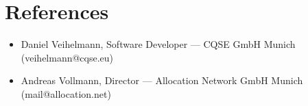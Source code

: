 \documentclass[11pt,a4paper]{article}
\begin{document}
\vspace{-10pt}

\section*{References}
\begin{itemize}
	\item Daniel Veihelmann, Software Developer — CQSE GmbH Munich (veihelmann@cqse.eu)
	\item Andreas Vollmann, Director — Allocation Network GmbH Munich (mail@allocation.net)
\end{itemize}
\end{document}

